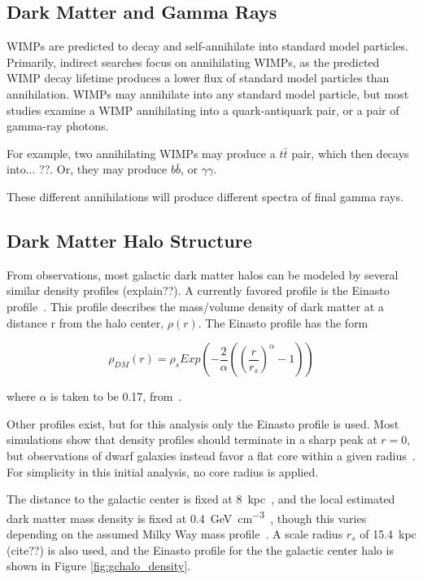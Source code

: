   \subsection{Dark Matter and Gamma Rays}
    WIMPs are predicted to decay and self-annihilate into standard model particles.
    Primarily, indirect searches focus on annihilating WIMPs, as the predicted WIMP decay lifetime produces a lower flux of standard model particles than annihilation.
    WIMPs may annihilate into any standard model particle, but most studies examine a WIMP annihilating into a quark-antiquark pair, or a pair of gamma-ray photons.

    For example, two annihilating WIMPs may produce a $t\bar{t}$ pair, which then decays into... {\color{red}??}.
    Or, they may produce $b\bar{b}$, or $\gamma\gamma$.

    These different annihilations will produce different spectra of final gamma rays.
  
  \subsection{Dark Matter Halo Structure}\label{dm_spatial}
    From observations, most galactic dark matter halos can be modeled by several similar density profiles {\color{red}(explain??)}.
    A currently favored profile is the Einasto profile~\cite{einastoprofile1,einastoprofile2}.
    This profile describes the mass/volume density of dark matter at a distance r from the halo center, $\rho(r)$.
    The Einasto profile has the form

    \begin{equation} \label{eqn:einasto}
      \rho_{DM} \left( r \right) = \rho_{s} Exp \left( - \frac{2}{\alpha} \left( {\left( \frac{r}{r_s} \right)}^{\alpha} - 1 \right) \right)
    \end{equation}
    
    where $\alpha$ is taken to be 0.17, from~\cite{PieriGalaxySims}.

    Other profiles exist, but for this analysis only the Einasto profile is used.
    Most simulations show that density profiles should terminate in a sharp peak at $r=0$, but observations of dwarf galaxies instead favor a flat core within a given radius~\cite{CoreVsCusp}.
    For simplicity in this initial analysis, no core radius is applied.
    
    The distance to the galactic center is fixed at \SI{8}{kpc}~\cite{gc_distance_1,gc_distance_2,gc_distance_3}, and the local estimated dark matter mass density is fixed at \SI{0.4}{\GeV\per\cm^3}~\cite{local_dm_density}, though this varies depending on the assumed Milky Way mass profile~\cite{direct_dm_astrophysical_uncertainties}.
    A scale radius $r_s$ of \SI{15.4}{kpc} {\color{red}(cite??)} is also used, and the Einasto profile for the the galactic center halo is shown in Figure \ref{fig:gchalo_density}.
  
